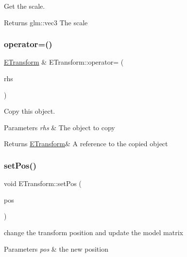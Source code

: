 Get the scale. 

\begin{DoxyReturn}{Returns}
glm\+::vec3 The scale 
\end{DoxyReturn}
\mbox{\label{class_e_transform_a5bc967bbd05f50d7f32b8d796d469ee9}} 
\subsubsection{\texorpdfstring{operator=()}{operator=()}}
{\footnotesize\ttfamily \hyperlink{class_e_transform}{E\+Transform} \& E\+Transform\+::operator= (\begin{DoxyParamCaption}\item[{\hyperlink{class_e_transform}{E\+Transform} const \&}]{rhs }\end{DoxyParamCaption})}



Copy this object. 


\begin{DoxyParams}{Parameters}
{\em rhs} & The object to copy \\
\hline
\end{DoxyParams}
\begin{DoxyReturn}{Returns}
\hyperlink{class_e_transform}{E\+Transform}\& A reference to the copied object 
\end{DoxyReturn}
\mbox{\label{class_e_transform_acfaf5964948ca842e863c0361a171e39}} 
\subsubsection{\texorpdfstring{set\+Pos()}{setPos()}}
{\footnotesize\ttfamily void E\+Transform\+::set\+Pos (\begin{DoxyParamCaption}\item[{glm\+::vec3 const}]{pos }\end{DoxyParamCaption})}



change the transform position and update the model matrix 


\begin{DoxyParams}{Parameters}
{\em pos} & the new position \\
\hline
\end{DoxyParams}
\mbox{\label{class_e_transform_a68695d3bd428556f04867ffc00cfbe64}} 

